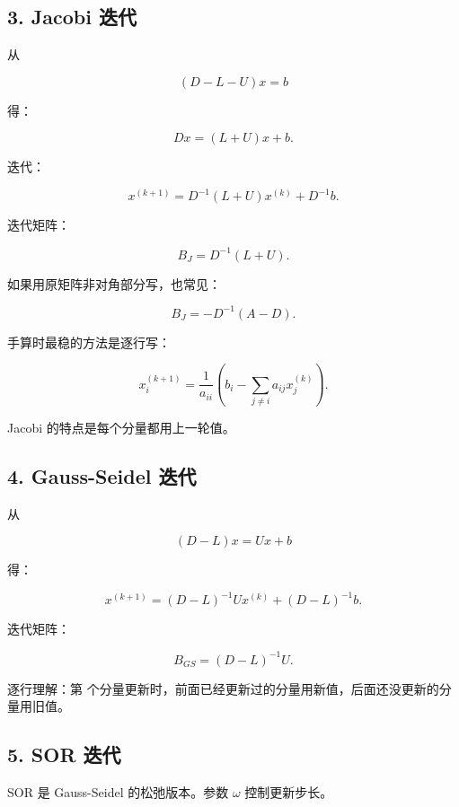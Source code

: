 \documentclass[11pt,a4paper]{ctexart}
\newcommand{\code}[1]{\begingroup\ttfamily\small #1\endgroup}
\begin{document}

\subsection*{3. Jacobi 迭代}


从

\[
(D-L-U)x=b
\]

得：

\[
Dx=(L+U)x+b.
\]

迭代：

\[
x^{(k+1)}=D^{-1}(L+U)x^{(k)}+D^{-1}b.
\]

迭代矩阵：

\[
B_J=D^{-1}(L+U).
\]

如果用原矩阵非对角部分写，也常见：

\[
B_J=-D^{-1}(A-D).
\]

手算时最稳的方法是逐行写：

\[
x_i^{(k+1)}=\frac{1}{a_{ii}}\left(b_i-\sum_{j\ne i}a_{ij}x_j^{(k)}\right).
\]

Jacobi 的特点是每个分量都用上一轮值。


\subsection*{4. Gauss-Seidel 迭代}


从

\[
(D-L)x=Ux+b
\]

得：

\[
x^{(k+1)}=(D-L)^{-1}Ux^{(k)}+(D-L)^{-1}b.
\]

迭代矩阵：

\[
B_{GS}=(D-L)^{-1}U.
\]

逐行理解：第 \code{} 个分量更新时，前面已经更新过的分量用新值，后面还没更新的分量用旧值。


\subsection*{5. SOR 迭代}


SOR 是 Gauss-Seidel 的松弛版本。参数 $\omega$ 控制更新步长。
\end{document}
